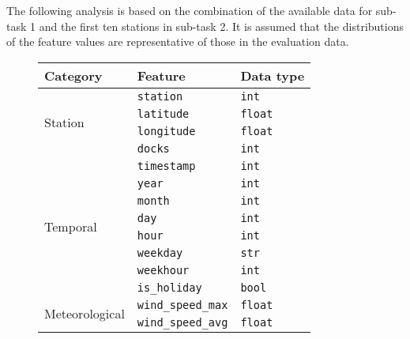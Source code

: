 \documentclass[11pt]{extarticle}
\begin{document}
The following analysis is based on the combination of the available data for sub-task 1
and the first ten stations in sub-task 2.
It is assumed that the distributions of the feature values are representative of those
in the evaluation data.

\begin{figure}
  \centering
  \begin{tabular}{lll}
    Category                               & Feature                              & Data type
    \\
    \hline \multirow{4}{*}{Station}        & \texttt{station}                     &
    \texttt{int}
    \\
                                           & \texttt{latitude}                    & \texttt{float}
    \\
                                           & \texttt{longitude}                   &
    \texttt{float}
    \\
                                           & \texttt{docks}                       & \texttt{int}
    \\
    \hline \multirow{8}{*}{Temporal}       &
    \texttt{timestamp}                     & \texttt{int}
    \\
                                           & \texttt{year}                        & \texttt{int}
    \\
                                           & \texttt{month}
                                           & \texttt{int}
    \\
                                           & \texttt{day}                         & \texttt{int}
    \\
                                           & \texttt{hour}                        & \texttt{int}
    \\
                                           &
    \texttt{weekday}                       & \texttt{str}
    \\
                                           & \texttt{weekhour}                    & \texttt{int}
    \\
                                           &
    \texttt{is\_holiday}                   & \texttt{bool}
    \\
    \hline \multirow{7}{*}{Meteorological} &
    \texttt{wind\_speed\_max}              & \texttt{float}
    \\
                                           & \texttt{wind\_speed\_avg}            &
    \texttt{float}
    \\

\end{tabular}
\end{figure}
\end{document}
